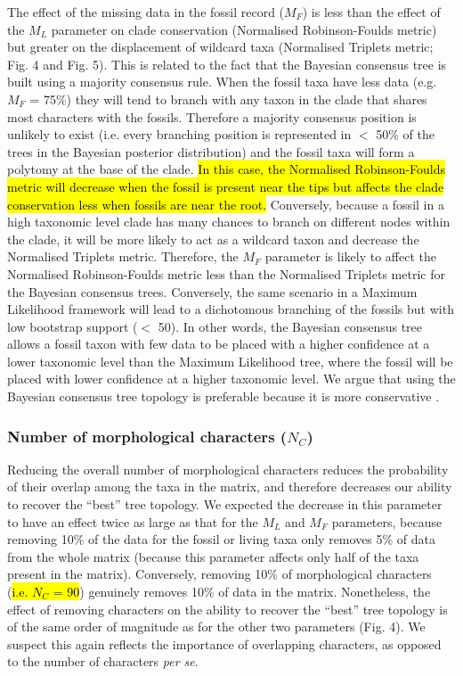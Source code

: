 \documentclass[12pt,letterpaper]{article}
\begin{document}
The effect of the missing data in the fossil record ($M_{F}$) is less than the effect of the $M_{L}$ parameter on clade conservation (Normalised Robinson-Foulds metric) but greater on the displacement of wildcard taxa (Normalised Triplets metric; Fig. 4 and Fig. 5).
This is related to the fact that the Bayesian consensus tree is built using a majority consensus rule.
When the fossil taxa have less data (e.g. $M_{F}$ = 75\%) they will tend to branch with any taxon in the clade that shares most characters with the fossils.
Therefore a majority consensus position is unlikely to exist (i.e. every branching position is represented in $<$ 50\% of the trees in the Bayesian posterior distribution) and the fossil taxa will form a polytomy at the base of the clade.
\hl{In this case, the Normalised Robinson-Foulds metric will decrease when the fossil is present near the tips but affects the clade conservation less when fossils are near the root.}
Conversely, because a fossil in a high taxonomic level clade has many chances to branch on different nodes within the clade, it will be more likely to act as a wildcard taxon and decrease the Normalised Triplets metric.
Therefore, the $M_{F}$ parameter is likely to affect the Normalised Robinson-Foulds metric less than the Normalised Triplets metric for the Bayesian consensus trees.
Conversely, the same scenario in a Maximum Likelihood framework will lead to a dichotomous branching of the fossils but with low bootstrap support ($<$ 50).
In other words, the Bayesian consensus tree allows a fossil taxon with few data to be placed with a higher confidence at a lower taxonomic level than the Maximum Likelihood tree, where the fossil will be placed with lower confidence at a higher taxonomic level.
We argue that using the Bayesian consensus tree topology is preferable because it is more conservative \citep[e.g.][]{pattinsonphylogeny2014}.

\subsubsection{Number of morphological characters ($N_{C}$)}
Reducing the overall number of morphological characters reduces the probability of their overlap among the taxa in the matrix, and therefore decreases our ability to recover the ``best'' tree topology.
We expected the decrease in this parameter to have an effect twice as large as that for the $M_{L}$ and $M_{F}$ parameters, because removing 10\% of the data for the fossil or living taxa only removes 5\% of data from the whole matrix (because this parameter affects only half of the taxa present in the matrix).
Conversely, removing 10\% of morphological characters (\hl{i.e. $N_{C}$ = 90}) genuinely removes 10\% of data in the matrix.
Nonetheless, the effect of removing characters on the ability to recover the ``best'' tree topology is of the same order of magnitude as for the other two parameters (Fig. 4).
We suspect this again reflects the importance of overlapping characters, as opposed to the number of characters \textit{per se}.
\end{document}
